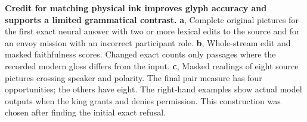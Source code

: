 \textbf{Credit for matching physical ink improves glyph accuracy and supports a limited grammatical contrast.} \textbf{a}, Complete original pictures for the first exact neural answer with two or more lexical edits to the source and for an envoy mission with an incorrect participant role. \textbf{b}, Whole-stream edit and masked faithfulness scores. Changed exact counts only passages where the recorded modern gloss differs from the input. \textbf{c}, Masked readings of eight source pictures crossing speaker and polarity. The final pair measure has four opportunities; the others have eight. The right-hand examples show actual model outputs when the king grants and denies permission. This construction was chosen after finding the initial exact refusal.

